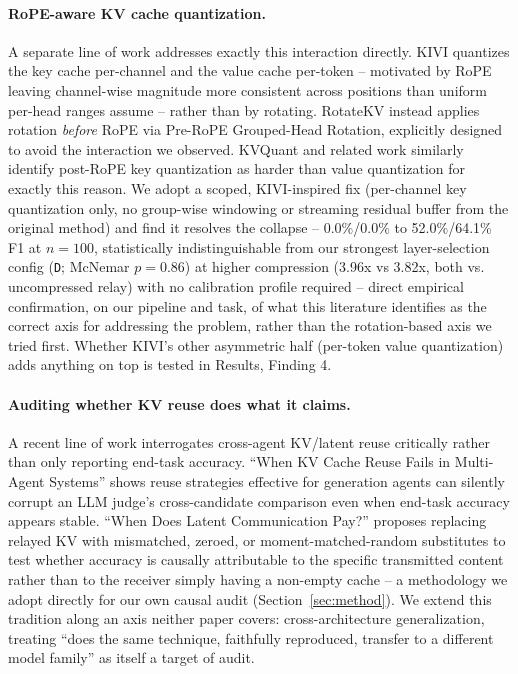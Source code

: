 \documentclass[11pt]{article}
\begin{document}
\paragraph{RoPE-aware KV cache quantization.} A separate line of work
addresses exactly this interaction directly. KIVI \citep{kivi2024}
quantizes the key cache per-channel and the value cache per-token --
motivated by RoPE leaving channel-wise magnitude more consistent across
positions than uniform per-head ranges assume -- rather than by rotating.
RotateKV \citep{rotatekv2025} instead applies rotation \emph{before} RoPE
via Pre-RoPE Grouped-Head Rotation, explicitly designed to avoid the
interaction we observed. KVQuant \citep{kvquant2024} and related work
similarly identify post-RoPE key quantization as harder than value
quantization for exactly this reason. We adopt a scoped, KIVI-inspired fix
(per-channel key quantization only, no group-wise windowing or streaming
residual buffer from the original method) and find it resolves the
collapse -- 0.0\%/0.0\% to 52.0\%/64.1\% F1 at $n=100$, statistically
indistinguishable from our strongest layer-selection config (\texttt{D};
McNemar $p=0.86$) at higher compression (3.96x vs 3.82x, both vs.
uncompressed relay) with no calibration profile required -- direct
empirical confirmation, on our pipeline and task, of what this literature
identifies as the correct
axis for addressing the problem, rather than the rotation-based axis we
tried first. Whether KIVI's other asymmetric half (per-token value
quantization) adds anything on top is tested in Results, Finding 4.

\paragraph{Auditing whether KV reuse does what it claims.} A recent line
of work interrogates cross-agent KV/latent reuse critically rather than
only reporting end-task accuracy. ``When KV Cache Reuse Fails in
Multi-Agent Systems'' \citep{kvreusefails2026} shows reuse strategies
effective for generation agents can silently corrupt an LLM judge's
cross-candidate comparison even when end-task accuracy appears stable.
``When Does Latent Communication Pay?'' \citep{latentcommpay2026} proposes
replacing relayed KV with mismatched, zeroed, or moment-matched-random
substitutes to test whether accuracy is causally attributable to the
specific transmitted content rather than to the receiver simply having a
non-empty cache -- a methodology we adopt directly for our own causal
audit (Section~\ref{sec:method}). We extend this tradition along an axis
neither paper covers: cross-architecture generalization, treating ``does
the same technique, faithfully reproduced, transfer to a different model
family'' as itself a target of audit.
\end{document}
